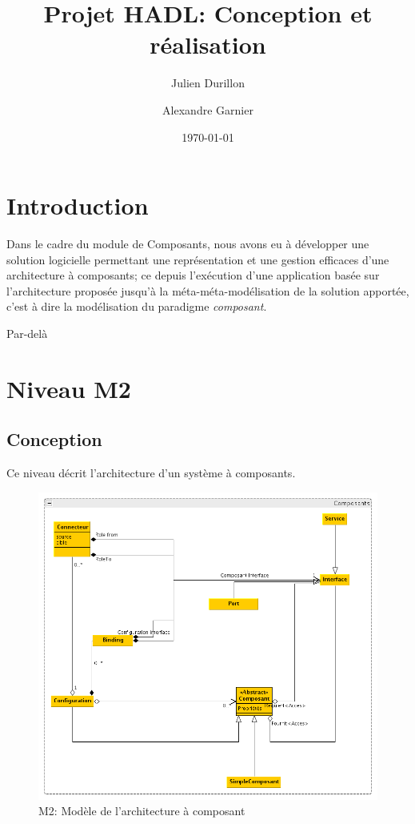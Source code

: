 \documentclass[a4paper, titlepage]{article}
\title{Projet HADL: Conception et réalisation}
\author{Julien Durillon \and Alexandre Garnier}
\date{\today}
\begin{document}
	\maketitle

	\tableofcontents\clearpage
	
	\section*{Introduction}

	  Dans le cadre du module de Composants, nous avons eu à développer une
	  solution logicielle permettant une représentation et une gestion efficaces
	  d'une architecture à composants; ce depuis l'exécution d'une application
	  basée sur l'architecture proposée jusqu'à la méta-méta-modélisation de la
	  solution apportée, c'est à dire la modélisation du paradigme
	  \emph{composant}.

    Par-delà

	\section{Niveau M2}
		\subsection{Conception}
			Ce niveau décrit l'architecture d'un système à composants.
		
			\begin{figure}[ht]
				\centering
				\includegraphics[width=1.00\textwidth]{M2.png}
				\caption{M2: Modèle de l'architecture à composant}
				\label{fig:m2}
			\end{figure}
		
\end{document}

